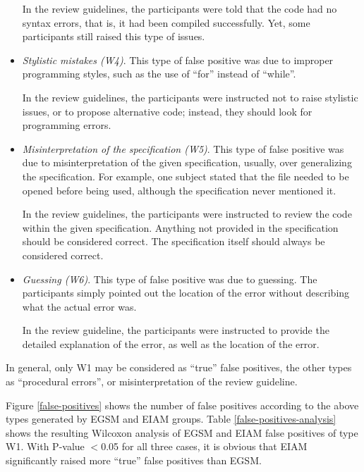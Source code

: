 \begin{itemize}
In the review guidelines, the participants were told that the code
had no syntax errors, that is, it had been compiled
successfully.  Yet, some participants still raised
this type of issues.

\item {\it Stylistic mistakes (W4)}. This type of false positive was
due to improper programming styles, such as
the use of  ``for'' instead of ``while''.

In the review guidelines, the participants were instructed not to raise
stylistic issues, or to propose alternative code; instead,
they should look for programming errors.

\item {\it Misinterpretation of the specification (W5)}. This type of
false positive  was due to misinterpretation of the given specification,
usually, over generalizing the specification.
For example, one subject stated that the file
needed to be opened before being used, although the specification
never mentioned it.

In the review guidelines, the participants were instructed to review
the code within the given specification. Anything not provided in the
specification should be considered correct. The specification itself
should always be considered correct.


\item {\it Guessing (W6)}. This type of false positive was due to
guessing. The participants simply pointed out
the location of the error without describing what the actual
error was. 

In the review guideline, the participants were instructed to provide
the detailed explanation of the error, as well as the location of the
error.

\end{itemize}

In general, only W1 may be considered as ``true'' false positives, the
other types as  ``procedural errors'', or misinterpretation of the
review guideline. 

Figure \ref{false-positives} shows the number of false positives
according to the above types generated by EGSM and EIAM groups.
Table \ref{false-positives-analysis} shows the resulting Wilcoxon
analysis of EGSM and EIAM false positives of type W1. 
With P-value $<$0.05 for all three cases, it is obvious that
 EIAM significantly raised more ``true'' false positives than EGSM.

